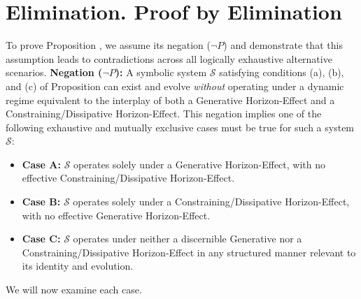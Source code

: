 \section{Elimination. Proof by Elimination}
\label{sec:appC_proof_by_elimination}
To prove Proposition , we assume its negation (\(\neg P\)) and demonstrate that this assumption leads to contradictions across all logically exhaustive alternative scenarios.
\textbf{Negation (\(\neg P\)):} A symbolic system \(\mathcal{S}\) satisfying conditions (a), (b), and (c) of Proposition  can exist and evolve \emph{without} operating under a dynamic regime equivalent to the interplay of both a Generative Horizon-Effect and a Constraining/Dissipative Horizon-Effect.
This negation implies one of the following exhaustive and mutually exclusive cases must be true for such a system \(\mathcal{S}\):
\begin{itemize}
    \item \textbf{Case A:} \(\mathcal{S}\) operates solely under a Generative Horizon-Effect, with no effective Constraining/Dissipative Horizon-Effect.
    \item \textbf{Case B:} \(\mathcal{S}\) operates solely under a Constraining/Dissipative Horizon-Effect, with no effective Generative Horizon-Effect.
    \item \textbf{Case C:} \(\mathcal{S}\) operates under neither a discernible Generative nor a Constraining/Dissipative Horizon-Effect in any structured manner relevant to its identity and evolution.
\end{itemize}
We will now examine each case.
